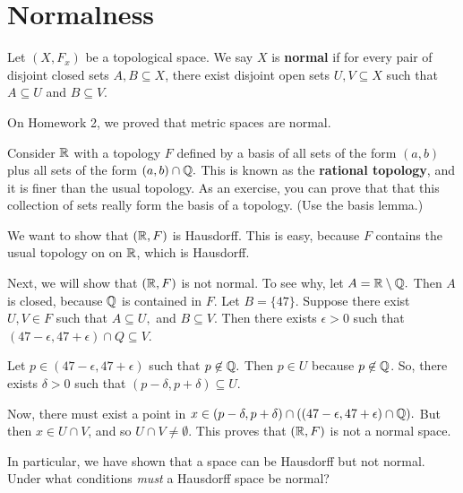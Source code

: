 

\section{Normalness}
\begin{definition}
	Let $(X,F_x)$ be a topological space. We say $X$ is \textbf{normal} if for every pair of disjoint closed sets $A,B \subseteq X$, there exist disjoint open sets $U,V\subseteq X$ such that $A \subseteq U$ and $B \subseteq V$. 
\end{definition}

On Homework 2, we proved that metric spaces are normal.
\begin{example}
	Consider $\mathbb R$ with a topology $F$ defined by a basis of all sets of the form $(a,b)$ plus all sets of the form $(a,b)\cap \mathbb Q.$ This is known as the \textbf{rational topology}, and it is finer than the usual topology. As an exercise, you can prove that that this collection of sets really form the basis of a topology. (Use the basis lemma.) 

We want to show that $(\mathbb R,F)$ is Hausdorff. This is easy, because $F$ contains the usual topology on on $\mathbb R$, which is Hausdorff. 

Next, we will show that $(\mathbb R,F)$ is not normal. To see why, let $A=\mathbb R\setminus\mathbb Q.$ Then $A$ is closed, because $\mathbb Q$ is contained in $F$. Let $B=\{47\}.$ Suppose there exist $U,V \in F$ such that $A \subseteq U,$ and $B \subseteq V$. Then there exists $\epsilon>0$ such that $(47-\epsilon,47+\epsilon)\cap Q \subseteq V$. 

Let $p \in (47-\epsilon,47+\epsilon)$ such that $p \not\in \mathbb Q.$ Then $p \in U$ because $p \not\in \mathbb Q$. So, there exists $\delta>0$ such that $(p-\delta,p+\delta) \subseteq U$. 

Now, there must exist a point in $x \in (p-\delta,p+\delta)\cap((47-\epsilon,47+\epsilon) \cap \mathbb Q).$ But then $x \in U \cap V$, and so $U \cap V \neq \emptyset$. This proves that $(\mathbb R,F)$ is not a normal space.
\end{example}

In particular, we have shown that a space can be Hausdorff but not normal. Under what conditions \emph{must} a Hausdorff space be normal?

